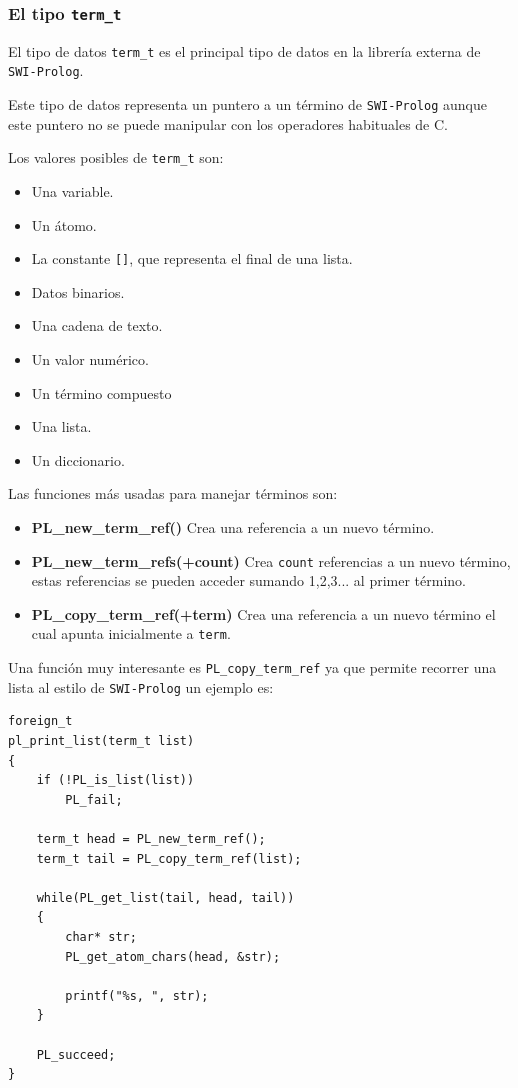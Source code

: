 \documentclass[a4paper]{article}
\begin{document}
\subsubsection{El tipo \texttt{term\_t}}
El tipo de datos \texttt{term\_t} es el principal tipo de datos en la librería externa de \texttt{SWI-Prolog}.

Este tipo de datos representa un puntero a un término de \texttt{SWI-Prolog} aunque este puntero no se puede manipular con los operadores habituales de C.

Los valores posibles de \texttt{term\_t} son:
\begin{itemize}
	\item Una variable.
	\item Un átomo.
	\item La constante \texttt{[]}, que representa el final de una lista.
	\item Datos binarios.
	\item Una cadena de texto.
	\item Un valor numérico.
	\item Un término compuesto
	\item Una lista.
	\item Un diccionario.
\end{itemize}

Las funciones más usadas para manejar términos son:
\begin{itemize}
	\item \textbf{PL\_new\_term\_ref()} Crea una referencia a un nuevo término.
	\item \textbf{PL\_new\_term\_refs(+count)} Crea \texttt{count} referencias a un nuevo término, estas referencias se pueden acceder sumando 1,2,3... al primer término.
	\item \textbf{PL\_copy\_term\_ref(+term)} Crea una referencia a un nuevo término el cual apunta inicialmente a \texttt{term}.
\end{itemize}

Una función muy interesante es \texttt{PL\_copy\_term\_ref} ya que permite recorrer una lista al estilo de \texttt{SWI-Prolog} un ejemplo es:

\begin{lstlisting}[style=C++]
foreign_t
pl_print_list(term_t list)
{
	if (!PL_is_list(list))
		PL_fail;
	
    term_t head = PL_new_term_ref();
    term_t tail = PL_copy_term_ref(list);
	
	while(PL_get_list(tail, head, tail))
	{
		char* str;
		PL_get_atom_chars(head, &str);
		
		printf("%s, ", str);
	}
	
	PL_succeed;
}
\end{lstlisting}
\end{document}
